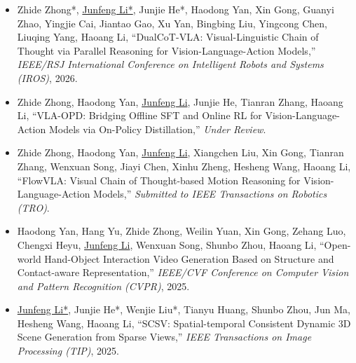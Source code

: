 \documentclass[letterpaper,11pt]{article}
\begin{document}
\begin{small}
\begin{itemize}
    \item[\textbf{[5]}] Zhide Zhong*, \underline{Junfeng Li*}, Junjie He*, Haodong Yan,
      Xin Gong, Guanyi Zhao, Yingjie Cai, Jiantao Gao, Xu Yan, Bingbing Liu, Yingcong Chen, Liuqing Yang, Haoang Li,
      ``DualCoT-VLA: Visual-Linguistic Chain of Thought via Parallel Reasoning for Vision-Language-Action Models,''
      \textit{IEEE/RSJ International Conference on Intelligent Robots and Systems (IROS)}, 2026.

    \item[\textbf{[6]}] Zhide Zhong, Haodong Yan, \underline{Junfeng Li}, Junjie He, Tianran Zhang, Haoang Li,
      ``VLA-OPD: Bridging Offline SFT and Online RL for Vision-Language-Action Models via On-Policy Distillation,''
      \textit{Under Review}.

    \item[\textbf{[7]}] Zhide Zhong, Haodong Yan, \underline{Junfeng Li}, Xiangchen Liu,
      Xin Gong, Tianran Zhang, Wenxuan Song, Jiayi Chen, Xinhu Zheng, Hesheng Wang, Haoang Li,
      ``FlowVLA: Visual Chain of Thought-based Motion Reasoning for Vision-Language-Action Models,''
      \textit{Submitted to IEEE Transactions on Robotics (TRO)}.

    \item[\textbf{[8]}] Haodong Yan, Hang Yu, Zhide Zhong, Weilin Yuan, Xin Gong,
      Zehang Luo, Chengxi Heyu, \underline{Junfeng Li}, Wenxuan Song, Shunbo Zhou, Haoang Li,
      ``Open-world Hand-Object Interaction Video Generation Based on Structure and Contact-aware Representation,''
      \textit{IEEE/CVF Conference on Computer Vision and Pattern Recognition (CVPR)}, 2025.

    \item[\textbf{[9]}] \underline{Junfeng Li*}, Junjie He*, Wenjie Liu*, Tianyu Huang,
      Shunbo Zhou, Jun Ma, Hesheng Wang, Haoang Li,
      ``SCSV: Spatial-temporal Consistent Dynamic 3D Scene Generation from Sparse Views,''
      \textit{IEEE Transactions on Image Processing (TIP)}, 2025.
  \end{itemize}
  \end{small}
\end{document}
